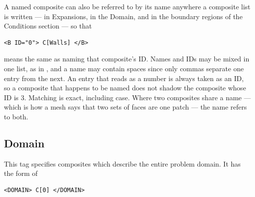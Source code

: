 A named composite can also be referred to by its name anywhere a composite
list is written --- in Expansions, in the Domain, and in the boundary regions
of the Conditions section --- so that
\begin{lstlisting}[style=XMLStyle]
<B ID="0"> C[Walls] </B>
\end{lstlisting}
means the same as naming that composite's ID. Names and IDs may be mixed in
one list, as in , and a name may contain spaces since only
commas separate one entry from the next. An entry that reads as a number is
always taken as an ID, so a composite that happens to be named  does
not shadow the composite whose ID is 3. Matching is exact, including case.
Where two composites share a name --- which is how a mesh says that two sets
of faces are one patch --- the name refers to both.

\subsection{Domain}
This tag specifies composites which describe the entire problem domain. It has the form of
\begin{lstlisting}[style=XMLStyle]
<DOMAIN> C[0] </DOMAIN>
\end{lstlisting}
